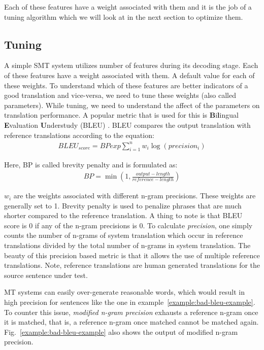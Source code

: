 Each of these features have a weight associated with them and it is the job of a tuning algorithm which we will look at in the next section to optimize them.

\subsection{Tuning}
A simple SMT system utilizes number of features during its decoding stage. Each of these features have a weight associated with them. A default value for each of these weights. To understand which of these features are better indicators of a good translation and vice-versa, we need to tune these weights (also called parameters). While tuning, we need to understand the affect of the parameters on translation performance. A popular metric that is used for this is \textbf{B}i\textbf{l}ingual \textbf{E}valuation \textbf{U}nderstudy (BLEU) \cite{Papineni2002}. BLEU compares the output translation with reference translations according to the equation:
\begin{eqnarray}
	BLEU_{score} = BP exp\sum_{i=1}^{n}w_i \log(precision_i)
\end{eqnarray}

Here, BP is called brevity penalty and is formulated as:
\begin{eqnarray}
	BP = \min(1, \frac{output-length}{reference-length})
\end{eqnarray}

$w_i$ are the weights associated with different n-gram precisions. These weights are generally set to 1. Brevity penalty is used to penalize phrases that are much shorter compared to the reference translation. A thing to note is that BLEU score is 0 if any of the n-gram precisions is 0. To calculate \textit{precision}, one simply counts the number of n-grams of system translation which occur in reference translations divided by the total number of n-grams in system translation. The beauty of this precision based metric is that it allows the use of multiple reference translations. Note, reference translations are human generated translations for the source sentence under test.

MT systems can easily over-generate reasonable words, which would result in high precision for sentences like the one in example~\ref{example:bad-bleu-example}. To counter this issue, \textit{modified n-gram precision} exhausts a reference n-gram once it is matched, that is, a reference n-gram once matched cannot be matched again. Fig.~\ref{example:bad-bleu-example} also shows the output of modified n-gram precision.

